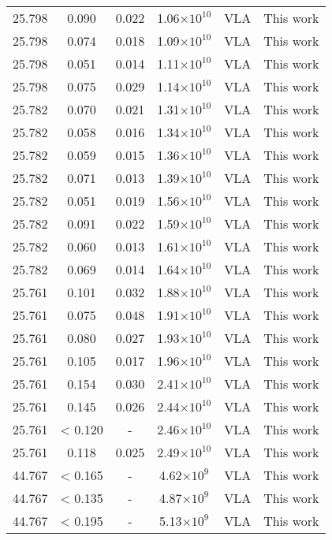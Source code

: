 \documentclass{aa}
\begin{document}
{\begin{longtable}{c|c|c|c|c|c}
 25.798 &   0.090   &  0.022 &  1.06$\times 10^{10}$ &  VLA & This work \\
 25.798 &   0.074   &  0.018 &  1.09$\times 10^{10}$ &  VLA & This work \\
 25.798 &   0.051   &  0.014 &  1.11$\times 10^{10}$ &  VLA & This work \\
 25.798 &   0.075   &  0.029 &  1.14$\times 10^{10}$ &  VLA & This work \\
 25.782 &   0.070   &  0.021 &  1.31$\times 10^{10}$ &  VLA & This work \\
 25.782 &   0.058   &  0.016 &  1.34$\times 10^{10}$ &  VLA & This work \\
 25.782 &   0.059   &  0.015 &  1.36$\times 10^{10}$ &  VLA & This work \\
 25.782 &   0.071   &  0.013 &  1.39$\times 10^{10}$ &  VLA & This work \\
 25.782 &   0.051   &  0.019 &  1.56$\times 10^{10}$ &  VLA & This work \\
 25.782 &   0.091   &  0.022 &  1.59$\times 10^{10}$ &  VLA & This work \\
 25.782 &   0.060   &  0.013 &  1.61$\times 10^{10}$ &  VLA & This work \\
 25.782 &   0.069   &  0.014 &  1.64$\times 10^{10}$ &  VLA & This work \\
 25.761 &   0.101   &  0.032 &  1.88$\times 10^{10}$ &  VLA & This work \\
 25.761 &   0.075   &  0.048 &  1.91$\times 10^{10}$ &  VLA & This work \\
 25.761 &   0.080   &  0.027 &  1.93$\times 10^{10}$ &  VLA & This work \\
 25.761 &   0.105   &  0.017 &  1.96$\times 10^{10}$ &  VLA & This work \\
 25.761 &   0.154   &  0.030 &  2.41$\times 10^{10}$ &  VLA & This work \\
 25.761 &   0.145   &  0.026 &  2.44$\times 10^{10}$ &  VLA & This work \\
 25.761 &   < 0.120 &  -     &  2.46$\times 10^{10}$ &  VLA & This work \\
 25.761 &   0.118   &  0.025 &  2.49$\times 10^{10}$ &  VLA & This work \\
 44.767 &   < 0.165 &  -     &  4.62$\times 10^{9}$  &  VLA & This work \\
 44.767 &   < 0.135 &  -     &  4.87$\times 10^{9}$  &  VLA & This work \\
 44.767 &   < 0.195 &  -     &  5.13$\times 10^{9}$  &  VLA & This work \\

\end{longtable}}
\end{document}
